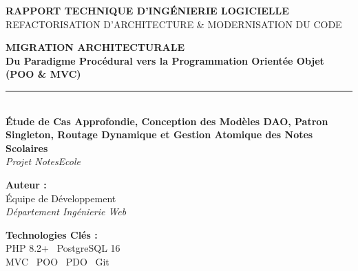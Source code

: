 \documentclass[11pt,a4paper,oneside]{report}
\begin{document}

\begin{titlepage}

    \vspace{-1.5cm}
    \begin{flushright}
        {\Large \textbf{\color{primaryDark}RAPPORT TECHNIQUE D'INGÉNIERIE LOGICIELLE}}\\[0.3cm]
        {\small \color{gray} REFACTORISATION D'ARCHITECTURE \& MODERNISATION DU CODE}
        \vspace{1.5cm}
    \end{flushright}

    \vspace{2cm}

    \begin{center}
        {\Huge \bfseries \color{primaryDark} MIGRATION ARCHITECTURALE}\\[0.5cm]
        {\LARGE \bfseries \color{primaryMed} Du Paradigme Procédural vers la Programmation Orientée Objet (POO \& MVC)}\\[0.8cm]
        
        \rule{0.6\linewidth}{2pt}\\[0.8cm]

        {\large \bfseries \color{darkText} Étude de Cas Approfondie, Conception des Modèles DAO, Patron Singleton, Routage Dynamique et Gestion Atomique des Notes Scolaires}\\[0.4cm]
        {\large \textit{\color{primaryMed} Projet NotesEcole}}
    \end{center}

    \vfill

    \begin{minipage}{0.48\textwidth}
        \begin{flushleft} \large
            \textbf{\color{primaryDark}Auteur :}\\
            Équipe de Développement\\
            \textit{Département Ingénierie Web}
        \end{flushleft}
    \end{minipage}
    \hfill
    \begin{minipage}{0.48\textwidth}
        \begin{flushright} \large
            \textbf{\color{primaryDark}Technologies Clés :}\\
            PHP 8.2+ \textbar\ PostgreSQL 16\\
            MVC \textbar\ POO \textbar\ PDO \textbar\ Git
        \end{flushright}
    \end{minipage}


\end{titlepage}
\end{document}

